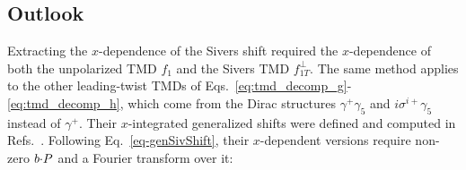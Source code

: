 \subsection{Outlook}
\label{sec:conclusion_outlook}

Extracting the $x$-dependence of the Sivers shift required the $x$-dependence of both the unpolarized TMD $f_1$ and the Sivers TMD $f_{1T}^\perp$. The same method applies to the other leading-twist TMDs of Eqs.~\eqref{eq:tmd_decomp_g}-\eqref{eq:tmd_decomp_h}, which come from the Dirac structures $\gamma^+\gamma_5$ and $i\sigma^{i+}\gamma_5$ instead of $\gamma^+$. Their $x$-integrated generalized shifts were defined and computed in Refs.~\cite{Musch:2011er, Musch:2010ka}. Following Eq.~\eqref{eq-genSivShift}, their $x$-dependent versions require non-zero $b{\cdot} P$ and a Fourier transform over it:
\begingroup\footnotesize
